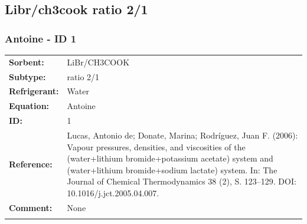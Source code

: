 \subsection{Libr/ch3cook ratio 2/1}
%
\subsubsection{Antoine - ID 1}
%
\begin{tabular}[l]{|lp{11.5cm}|}
\hline
\addlinespace

\textbf{Sorbent:} & LiBr/CH3COOK \\
\textbf{Subtype:} & ratio 2/1 \\
\textbf{Refrigerant:} & Water \\
\textbf{Equation:} & Antoine \\
\textbf{ID:} & 1 \\
\textbf{Reference:} & Lucas, Antonio de; Donate, Marina; Rodríguez, Juan F. (2006): Vapour pressures, densities, and viscosities of the (water+lithium bromide+potassium acetate) system and (water+lithium bromide+sodium lactate) system. In: The Journal of Chemical Thermodynamics 38 (2), S. 123–129. DOI: 10.1016/j.jct.2005.04.007. \\
\textbf{Comment:} & None \\

\addlinespace
\hline
\end{tabular}
\newline

